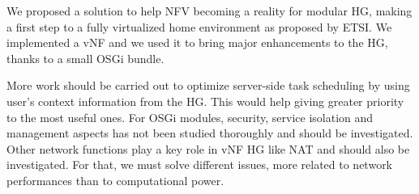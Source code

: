 We proposed a solution to help NFV becoming a reality for modular HG, making a first step to a fully virtualized home environment as proposed by ETSI.
We implemented a vNF and we used it to bring major enhancements to the HG, thanks to a small OSGi bundle.

More work should be carried out to optimize server-side task scheduling by using user's context information from the HG.
This would help giving greater priority to the most useful ones.
For OSGi modules, security, service isolation and management aspects has not been studied thoroughly and should be investigated.
Other network functions play a key role in vNF HG like NAT and should also be investigated.
For that, we must solve different issues, more related to network performances than to computational power. 
